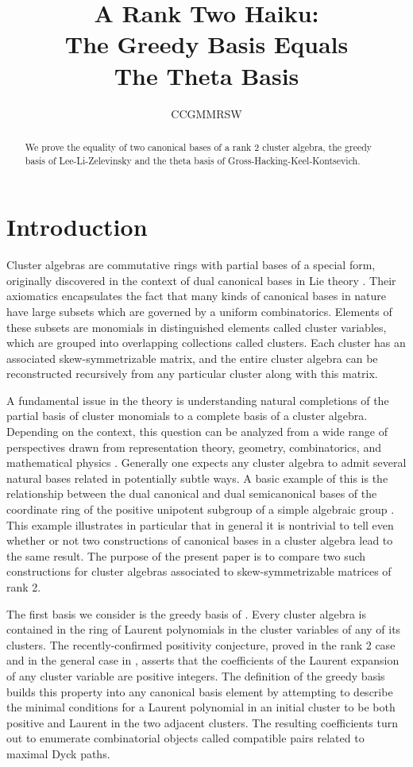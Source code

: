 \documentclass[10pt]{amsart}
\title[The Greedy Basis is the Theta Basis]{A Rank Two Haiku:\\ The Greedy Basis Equals \\ The Theta Basis}
\author{CCGMMRSW}
\theoremstyle{remark}
\numberwithin{equation}{section}
\begin{document}
\begin{abstract}
We prove the equality of two canonical bases of a rank 2 cluster algebra, the greedy basis of Lee-Li-Zelevinsky and the theta basis of Gross-Hacking-Keel-Kontsevich.
\end{abstract}

\maketitle

\section{Introduction}

Cluster algebras are commutative rings with partial bases of a special form, originally discovered in the context of dual canonical bases in Lie theory \cite{FZ}.  Their axiomatics encapsulates the fact that many kinds of canonical bases in nature have large subsets which are governed by a uniform combinatorics.  Elements of these subsets are monomials in distinguished elements called cluster variables, which are grouped into overlapping collections called clusters.  Each cluster has an associated skew-symmetrizable matrix, and the entire cluster algebra can be reconstructed recursively from any particular cluster along with this matrix.

A fundamental issue in the theory is understanding natural completions of the partial basis of cluster monomials to a complete basis of a cluster algebra.  Depending on the context, this question can be analyzed from a wide range of perspectives drawn from representation theory, geometry, combinatorics, and mathematical physics \cite{Dup,KQ,FG,MSW,BZ,Rup,GMN}.  Generally one expects any cluster algebra to admit several natural bases related in potentially subtle ways.  A basic example of this is the relationship between the dual canonical and dual semicanonical bases of the coordinate ring of the positive unipotent subgroup of a simple algebraic group \cite{GLS}.  This example illustrates in particular that in general it is nontrivial to tell even whether or not two constructions of canonical bases in a cluster algebra lead to the same result.  The purpose of the present paper is to compare two such constructions for cluster algebras associated to skew-symmetrizable matrices of rank 2.  

The first basis we consider is the greedy basis of \cite{LLZ}.  Every cluster algebra is contained in the ring of Laurent polynomials in the cluster variables of any of its clusters.  The recently-confirmed positivity conjecture, proved in the rank 2 case \cite{LS,Rup2} and in the general case in \cite{LS2,GHKK}, asserts that the coefficients of the Laurent expansion of any cluster variable are positive integers.  The definition of the greedy basis builds this property into any canonical basis element by attempting to describe the minimal conditions for a Laurent polynomial in an initial cluster to be both positive and Laurent in the two adjacent clusters.  The resulting coefficients turn out to enumerate combinatorial objects called compatible pairs related to maximal Dyck paths.  
\end{document}
